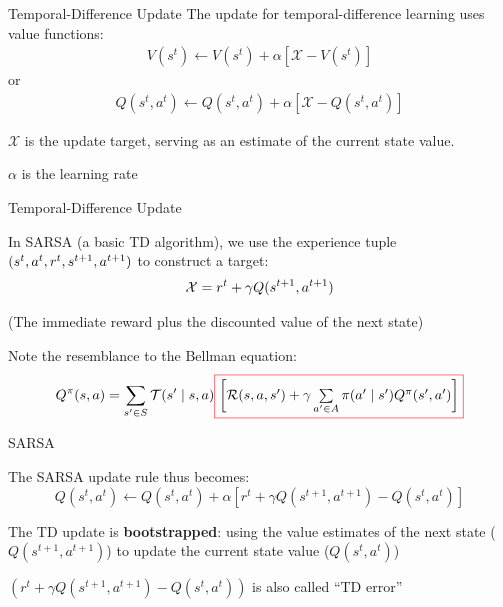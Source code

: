 \begin{frame}{Temporal-Difference Update}
    The update for temporal-difference learning uses value functions:
    \vspace{0pt}
    \begin{align*}
        V(s^{t}) \gets V(s^{t}) + \alpha \left[\mathcal{X} - V(s^{t})\right]
    \end{align*}
    or 
    \vspace{0pt}
    \begin{align*}
        Q(s^{t}, a^{t}) \gets Q(s^{t}, a^{t})  + \alpha \left[\mathcal{X} - Q(s^{t}, a^{t})\right]
    \end{align*}
	\blist
    	\item $\mathcal{X}$ is the update target, serving as an estimate of the current state value. 
    	\item $\alpha$ is the learning rate
    \elist
\end{frame}

\begin{frame}{Temporal-Difference Update}
    
    In SARSA (a basic TD algorithm), we use the experience tuple $(s^{t}, a^{t}, r^{t}, s^{t+1}, a^{t+1})$ to construct a target:
    \begin{align*}
        \mathcal{X} = r^t + \gamma Q(s^{t+1}, a^{t+1})
    \end{align*}
    
    (The immediate reward plus the discounted value of the next state)
    
    Note the resemblance to the Bellman equation:
    \begin{align*}
        Q^{\pi}(\st, \ac) = \sum_{\st' \in \St} \Stf(\st' \mid \st, \ac) \Cboxed{red}{$\left[ \Rew(\st, \ac, \st') + \gamma \sum\limits_{\ac' \in \Ac} \pi(\ac' \mid \st') Q^{\pi}(\st', \ac') \right]$}
    \end{align*}
\end{frame}

\begin{frame}{SARSA}
    
The SARSA update rule thus becomes:
$$
  Q(s^t, a^t) \leftarrow Q(s^t, a^t) + \alpha[r^t + \gamma Q(s^{t+1}, a^{t+1})- Q(s^t,a^t)] 
$$

\vspace{5pt}

\blist
	\itemsep=10pt
	\item The TD update is \textbf{bootstrapped}: using the value estimates of the next state ($Q(s^{t+1}, a^{t+1})$) to update the current state value ($Q(s^t,a^t)$)
    \item $\left( r^t + \gamma Q(s^{t+1}, a^{t+1})- Q(s^t,a^t) \right)$ is also called ``TD error''
\elist

\end{frame}

